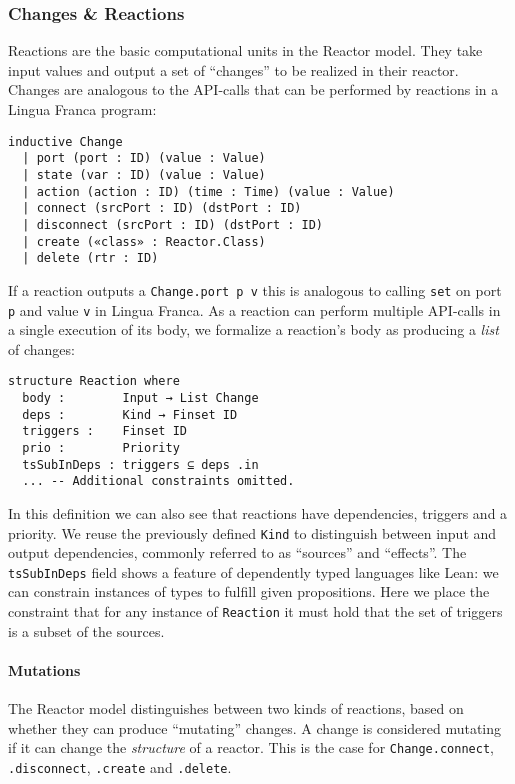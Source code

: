\subsubsection{Changes \& Reactions}

Reactions are the basic computational units in the Reactor model. 
They take input values and output a set of ``changes'' to be realized in their reactor.
Changes are analogous to the API-calls that can be performed by reactions in a Lingua Franca program:

\begin{lstlisting}
inductive Change
  | port (port : ID) (value : Value)
  | state (var : ID) (value : Value)
  | action (action : ID) (time : Time) (value : Value)
  | connect (srcPort : ID) (dstPort : ID)
  | disconnect (srcPort : ID) (dstPort : ID)
  | create («class» : Reactor.Class)
  | delete (rtr : ID)
\end{lstlisting}

If a reaction outputs a \lstinline{Change.port p v} this is analogous to calling \verb|set| on port \verb|p| and value \verb|v| in Lingua Franca.
As a reaction can perform multiple API-calls in a single execution of its body, we formalize a reaction's body as producing a \emph{list} of changes:

\begin{lstlisting}
structure Reaction where
  body :        Input → List Change
  deps :        Kind → Finset ID
  triggers :    Finset ID
  prio :        Priority
  tsSubInDeps : triggers ⊆ deps .in
  ... -- Additional constraints omitted.
\end{lstlisting}

In this definition we can also see that reactions have dependencies, triggers and a priority.
We reuse the previously defined \lstinline{Kind} to distinguish between input and output dependencies, commonly referred to as ``sources'' and ``effects''.
The \lstinline{tsSubInDeps} field shows a feature of dependently typed languages like Lean: we can constrain instances of types to fulfill given propositions.
Here we place the constraint that for any instance of \lstinline{Reaction} it must hold that the set of triggers is a subset of the sources.

\paragraph{Mutations}

The Reactor model distinguishes between two kinds of reactions, based on whether they can produce ``mutating'' changes.
A change is considered mutating if it can change the \emph{structure} of a reactor.
This is the case for \lstinline{Change.connect}, \lstinline{.disconnect}, \lstinline{.create} and \lstinline{.delete}.

